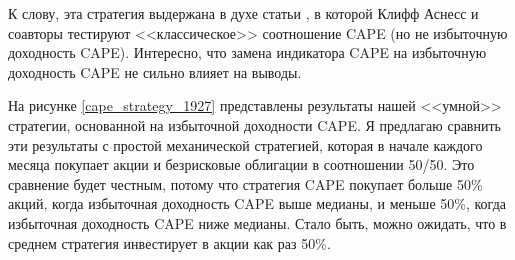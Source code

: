 К слову, эта стратегия выдержана в духе статьи \cite{asness2017market}, в 
которой Клифф Аснесс и соавторы тестируют <<классическое>> соотношение CAPE 
(но не избыточную доходность CAPE). Интересно, что замена индикатора CAPE на 
избыточную доходность CAPE не сильно влияет на выводы.

На рисунке \ref{cape_strategy_1927} представлены результаты нашей <<умной>> 
стратегии, основанной на избыточной доходности CAPE. Я предлагаю сравнить эти 
результаты с простой механической стратегией, которая в начале каждого месяца 
покупает акции и безрисковые облигации в соотношении 50/50. Это сравнение 
будет честным, потому что стратегия CAPE покупает больше 50\% акций, когда 
избыточная доходность CAPE выше медианы, и меньше 50\%, когда избыточная 
доходность CAPE ниже медианы. Стало быть, можно ожидать, что в среднем 
стратегия инвестирует в акции как раз 50\%. 

\newcommand{\plotThickOneAxis}{
   \plotThickAxis{1.0}   
}


